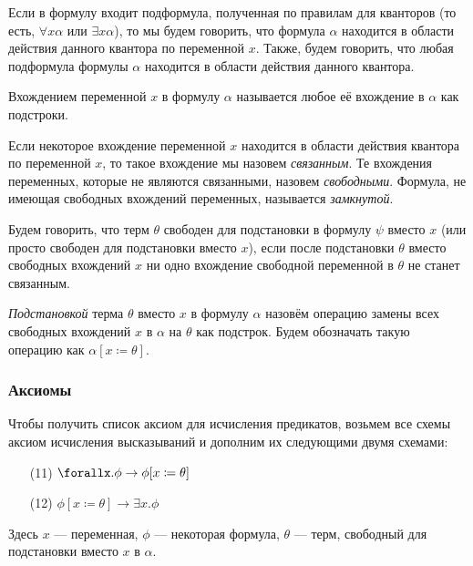 \documentclass[12pt,a4paper,oneside]{article}
\begin{document}
\begin{definition}Если в формулу входит подформула, полученная по правилам
для кванторов (то есть, $\forall x \alpha$ или $\exists x \alpha$), то 
мы будем говорить, что формула $\alpha$ находится в области действия 
данного квантора по переменной $x$. Также, будем говорить, что любая подформула 
формулы $\alpha$ находится в области действия данного квантора.
\end{definition}

\begin{definition}
Вхождением переменной $x$ в формулу $\alpha$ называется любое её вхождение в $\alpha$ как подстроки.
\end{definition}

\begin{definition}Если некоторое вхождение переменной $x$ находится
в области действия квантора по переменной $x$, то такое вхождение
мы назовем \emph{связанным}. Те вхождения переменных, которые не являются связанными, назовем \emph{свободными}. Формула, не имеющая 
свободных вхождений переменных, называется \emph{замкнутой}.
\end{definition}

\begin{definition}Будем говорить, что терм $\theta$ свободен для
подстановки в формулу $\psi$ вместо $x$ (или просто свободен для 
подстановки вместо $x$), если после подстановки $\theta$ вместо 
свободных вхождений $x$ ни одно вхождение свободной переменной
в $\theta$ не станет связанным.
\end{definition}

\begin{definition}
\emph{Подстановкой} терма $\theta$ вместо $x$ в формулу $\alpha$ назовём операцию замены всех свободных вхождений $x$ в $\alpha$ на $\theta$ как подстрок. Будем обозначать такую операцию как $\alpha[x \coloneqq  \theta]$. 
\end{definition}

\subsubsection*{Аксиомы}
Чтобы получить список аксиом для исчисления предикатов, возьмем все схемы
аксиом исчисления высказываний и дополним их следующими двумя схемами:
\begin{itemize}
    \item[(11)] $\forallx. \phi \rightarrow \phi[x \coloneqq  \theta]$
    \item[(12)] $\phi[x \coloneqq  \theta] \rightarrow \exists x. \phi$
\end{itemize}
Здесь $x$ --- переменная, $\phi$ --- некоторая формула, $\theta$ --- терм, свободный для подстановки вместо $x$ в $\alpha$.
\end{document}
